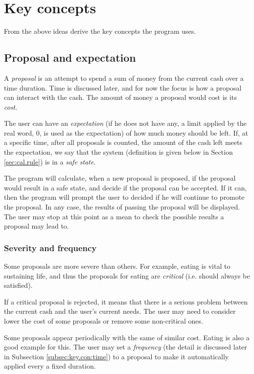 \section{Key concepts}
From the above ideas derive the key concepts the program uses.

\subsection{Proposal and expectation}
A \emph{proposal} is an attempt to spend a sum of money from the current cash over a time duration. Time is discussed later, and for now the focus is how a proposal can interact with the cash. The amount of money a proposal would cost is its \emph{cost}.

The user can have an \emph{expectation} (if he does not have any, a limit applied by the real word, 0, is used as the expectation) of how much money should be left. If, at a specific time, after all proposals is counted, the amount of the cash left meets the expectation, we say that the system (definition is given below in Section \ref{sec:cal.rule}) is in a \emph{safe state}.

The program will calculate, when a new proposal is proposed, if the proposal would result in a safe state, and decide if the proposal can be accepted. If it can, then the program will prompt the user to decided if he will continue to promote the proposal. In any case, the results of passing the proposal will be displayed. The user may stop at this point as a mean to check the possible results a proposal may lead to.

\subsubsection{Severity and frequency}
Some proposals are more severe than others. For example, eating is vital to sustaining life, and thus the proposals for eating are \emph{critical} (i.e. should always be satisfied). 

If a critical proposal is rejected, it means that there is a serious problem between the current cash and the user's current needs. The user may need to consider lower the cost of some proposals or remove some non-critical ones.

Some proposals appear periodically with the same of similar cost. Eating is also a good example for this. The user may set a \emph{frequency} (the detail is discussed later in Subsection \ref{subsec:key.con:time}) to a proposal to make it automatically applied every a fixed duration.

